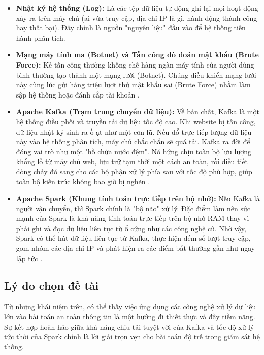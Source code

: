 \documentclass[12pt,a4paper]{report}
\begin{document}
\begin{itemize}
    \item \textbf{Nhật ký hệ thống (Log):} Là các tệp dữ liệu tự động ghi lại mọi hoạt động xảy ra trên máy chủ (ai vừa truy cập, địa chỉ IP là gì, hành động thành công hay thất bại). Đây chính là nguồn "nguyên liệu" đầu vào để hệ thống tiến hành phân tích.
    
    \item \textbf{Mạng máy tính ma (Botnet) và Tấn công dò đoán mật khẩu (Brute Force):} Kẻ tấn công thường khống chế hàng ngàn máy tính của người dùng bình thường tạo thành một mạng lưới (Botnet). Chúng điều khiển mạng lưới này cùng lúc gửi hàng triệu lượt thử mật khẩu sai (Brute Force) nhằm làm sập hệ thống hoặc đánh cắp tài khoản \cite{owasp2021}.
    
    \item \textbf{Apache Kafka (Trạm trung chuyển dữ liệu):} Về bản chất, Kafka là một hệ thống điều phối và truyền tải dữ liệu tốc độ cao. Khi website bị tấn công, dữ liệu nhật ký sinh ra ồ ạt như một cơn lũ. Nếu đổ trực tiếp lượng dữ liệu này vào hệ thống phân tích, máy chủ chắc chắn sẽ quá tải. Kafka ra đời để đóng vai trò như một "hồ chứa nước đệm". Nó hứng chịu toàn bộ lưu lượng khổng lồ từ máy chủ web, lưu trữ tạm thời một cách an toàn, rồi điều tiết dòng chảy đó sang cho các bộ phận xử lý phía sau với tốc độ phù hợp, giúp toàn bộ kiến trúc không bao giờ bị nghẽn \cite{kafka_doc}.
    
    \item \textbf{Apache Spark (Khung tính toán trực tiếp trên bộ nhớ):} Nếu Kafka là người vận chuyển, thì Spark chính là "bộ não" xử lý. Đặc điểm làm nên sức mạnh của Spark là khả năng tính toán trực tiếp trên bộ nhớ RAM thay vì phải ghi và đọc dữ liệu liên tục từ ổ cứng như các công nghệ cũ. Nhờ vậy, Spark có thể hút dữ liệu liên tục từ Kafka, thực hiện đếm số lượt truy cập, gom nhóm các địa chỉ IP và phát hiện ra các điểm bất thường gần như ngay lập tức \cite{spark_doc}.
\end{itemize}

\subsection{Lý do chọn đề tài}
Từ những khái niệm trên, có thể thấy việc ứng dụng các công nghệ xử lý dữ liệu lớn vào bài toán an toàn thông tin là một hướng đi thiết thực và đầy tiềm năng. Sự kết hợp hoàn hảo giữa khả năng chịu tải tuyệt vời của Kafka và tốc độ xử lý tức thời của Spark chính là lời giải trọn vẹn cho bài toán độ trễ trong giám sát hệ thống.
\end{document}
